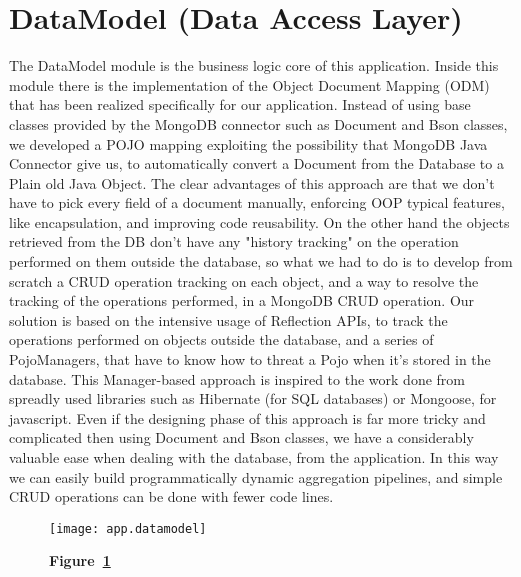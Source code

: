 \section{DataModel (Data Access Layer)}\label{sec:datamodel}
The DataModel module is the business logic core of this application.
Inside this module there is the implementation of the Object Document Mapping
(ODM) that has been realized specifically for our application.
Instead of using base classes provided by the MongoDB connector such as Document
and Bson classes, we developed a POJO mapping exploiting the possibility that
MongoDB Java Connector give us, to automatically convert a Document from the
Database to a Plain old Java Object. The clear advantages of this approach are
that we don't have to pick every field of a document manually, enforcing OOP
typical features, like encapsulation, and improving code reusability. On the
other hand the objects retrieved from the DB don't have any "history tracking"
on the operation performed on them outside the database, so what we had to do
is to develop from scratch a CRUD operation tracking on each object, and a way
to resolve the tracking of the operations performed, in a MongoDB CRUD
operation.
Our solution is based on the intensive usage of Reflection APIs, to track the
operations performed on objects outside the database, and a series of
PojoManagers, that have to know how to threat a Pojo when it's stored in the
database.
This Manager-based approach is inspired to the work done from spreadly used libraries such
as Hibernate (for SQL databases) or Mongoose, for javascript.
Even if the designing phase of this approach is far more tricky and complicated
then using Document and Bson classes, we have a considerably valuable ease when
dealing with the database, from the application. In this way we can easily build 
programmatically dynamic aggregation pipelines, and simple CRUD operations can
be done with fewer code lines.

\begin{landscape}
	\begin{figure}[!h]
		\texttt{[image: app.datamodel]}
		\caption*{\textbf{Figure~\ref{fig:datamodel}}}
		\captionlistentry{}\label{fig:datamodel}
	\end{figure}
\end{landscape}
